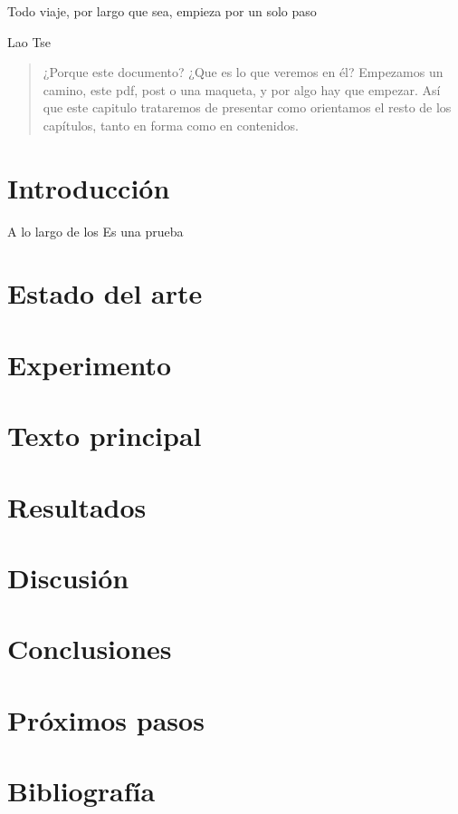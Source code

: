 
\epigraph{Todo viaje, por largo que sea, empieza por un solo paso}{Lao Tse}

\begin{abstract}
¿Porque este documento? ¿Que es lo que veremos en él? Empezamos un camino, este pdf, post o una maqueta, y por algo hay que empezar. Así que este capitulo trataremos de presentar como orientamos el resto de los capítulos, tanto en forma como en contenidos.
\end{abstract}

\section{Introducción}

A lo largo de los   
\cite{acemoglu2000} Es una prueba

\section{Estado del arte}

\section{Experimento}
\section{Texto principal}
\section{Resultados} 
\section{Discusión}
\section{Conclusiones}
\section{Próximos pasos}

\section{Bibliografía}
\printbibliography[heading=subbibliography]
